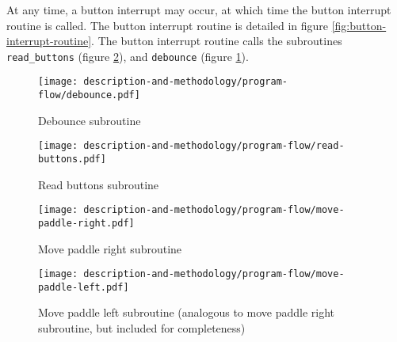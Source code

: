 At any time, a button interrupt may occur, at which time the button interrupt routine is called.
The button interrupt routine is detailed in figure \ref{fig:button-interrupt-routine}.
The button interrupt routine calls the subroutines \texttt{read\_buttons} (figure \ref{fig:read-buttons}), and \texttt{debounce} (figure \ref{fig:debounce}).

\begin{figure}
\texttt{[image: description-and-methodology/program-flow/debounce.pdf]}
\caption{Debounce subroutine}
\label{fig:debounce}
\end{figure}

\begin{figure}
\texttt{[image: description-and-methodology/program-flow/read-buttons.pdf]}
\caption{Read buttons subroutine}
\label{fig:read-buttons}
\end{figure}

\begin{figure}
\texttt{[image: description-and-methodology/program-flow/move-paddle-right.pdf]}
\caption{Move paddle right subroutine}
\label{fig:move-paddle-right}
\end{figure}

\begin{figure}
\texttt{[image: description-and-methodology/program-flow/move-paddle-left.pdf]}
\caption{Move paddle left subroutine (analogous to move paddle right subroutine, but included for completeness)}
\label{fig:move-paddle-left}
\end{figure}
